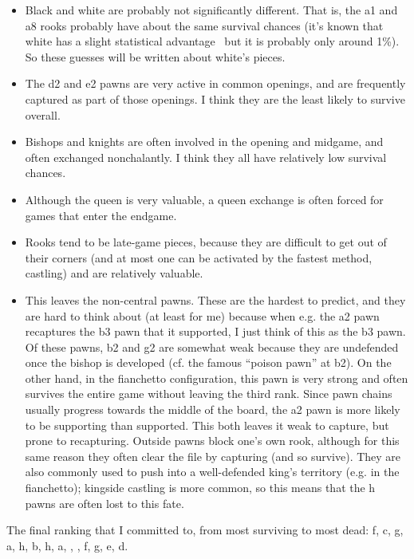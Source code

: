 \documentclass[twocolumn]{article}
\begin{document}
\begin{itemize}
\item Black and white are probably not significantly different. That
  is, the a1 and a8 rooks probably have about the same survival
  chances (it's known that white has a slight statistical
  advantage~\cite{chesstego} but it is probably only around 1\%). So
  these guesses will be written about white's pieces.
\item The d2 and e2 pawns are very active in common openings, and
  are frequently captured as part of those openings. I think they
  are the least likely to survive overall.
\item Bishops and knights are often involved in the opening and
  midgame, and often exchanged nonchalantly. I think they all have
  relatively low survival chances.
\item Although the queen is very valuable, a queen exchange is often
  forced for games that enter the endgame.
\item Rooks tend to be late-game pieces, because they are difficult
  to get out of their corners (and at most one can be activated
  by the fastest method, castling) and are relatively valuable.
\item This leaves the non-central pawns. These are the hardest to
  predict, and they are hard to think about (at least for me) because
  when e.g. the a2 pawn recaptures the b3 pawn that it supported, I
  just think of this as the b3 pawn. Of these pawns, b2 and g2 are
  somewhat weak because they are undefended once the bishop is
  developed (cf. the famous ``poison pawn'' at b2). On the other hand,
  in the fianchetto configuration, this pawn is very strong and often
  survives the entire game without leaving the third rank. Since pawn
  chains usually progress towards the middle of the board, the a2 pawn
  is more likely to be supporting than supported. This both leaves it
  weak to capture, but prone to recapturing. Outside pawns block one's
  own rook, although for this same reason they often clear the file by
  capturing (and so survive). They are also commonly used to push into
  a well-defended king's territory (e.g. in the fianchetto); kingside
  castling is more common, so this means that the h pawns are often
  lost to this fate.
\end{itemize}

The final ranking that I committed to, from most surviving to most dead:
\pawn f, \pawn c, \pawn g, \pawn a, \pawn h, \pawn b, \rook h, \rook a,
\king, \queen, \bishop f, \knight g, \pawn e, \pawn d.
\end{document}
